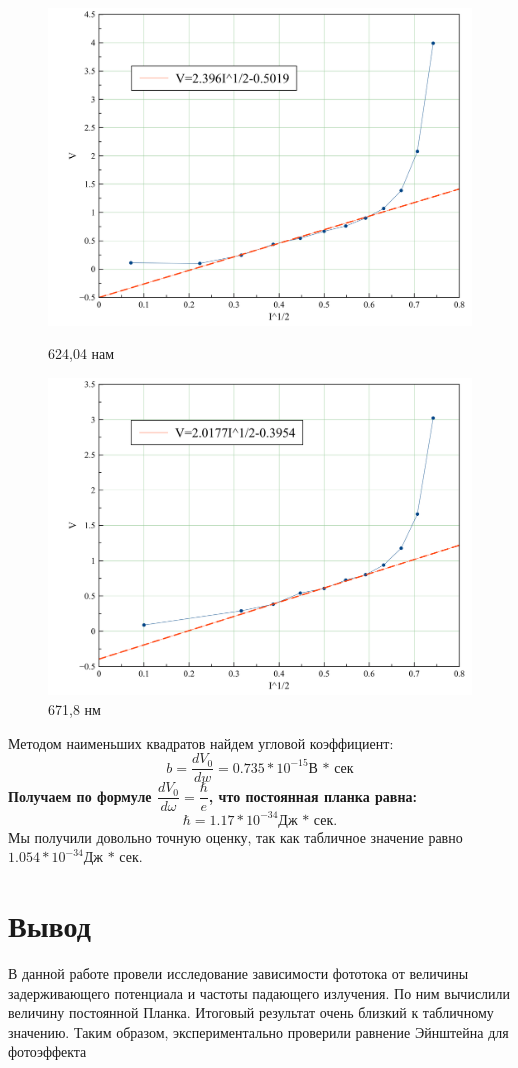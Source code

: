 \documentclass[a4paper,12pt]{article}
\begin{document}
\begin{center}
\begin{figure}
						\centering
						\includegraphics[width=0.6\linewidth]{2314}
						\caption{624,04 нам}
						
						\centering
						\includegraphics[width=0.6\linewidth]{2496}
						\caption{671,8 нм}
					\end{figure}
				\end{center}
			Методом наименьших квадратов найдем угловой коэффициент: $$b = \dfrac{dV_0}{dw} = 0.735  * 10^{-15} \text{В * сек}$$
			\textbf{Получаем по формуле $\dfrac{dV_0}{d\omega} = \dfrac{\hbar}{e}$, что постоянная планка равна: $$\hbar = 1.17 * 10 ^{-34} \text{Дж * сек}.$$}
			Мы получили довольно точную оценку, так как табличное значение равно $1.054* 10 ^{-34} \text{Дж * сек}.$
			
			
	\section*{Вывод}
	В данной работе провели исследование зависимости фототока от величины задерживающего потенциала и частоты падающего излучения. По ним вычислили величину постоянной Планка. Итоговый результат очень близкий к табличному значению. Таким образом, экспериментально проверили равнение Эйнштейна для фотоэффекта 

	

	
\end{document}
